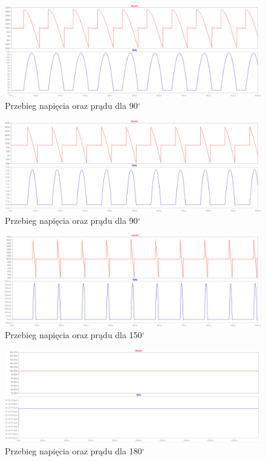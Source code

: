 \documentclass[11pt]{article}
\begin{document}
\begin{figure}[H]
    \centering
    \includegraphics[width=1\linewidth]{aun1_fbps-90.png}
    \caption{Przebieg napięcia oraz prądu dla 90$^{\circ}$}
    \label{fig:aun1_fbps-90}
\end{figure}
\begin{figure}[H]
    \centering
    \includegraphics[width=1\linewidth]{aun1_fbps-120.png}
    \caption{Przebieg napięcia oraz prądu dla 90$^{\circ}$}
    \label{fig:aun1_fbps-120}
\end{figure}
\begin{figure}[H]
    \centering
    \includegraphics[width=1\linewidth]{aun1_fbps-150.png}
    \caption{Przebieg napięcia oraz prądu dla 150$^{\circ}$}
    \label{fig:aun1_fbps-150}
\end{figure}
\begin{figure}[H]
    \centering
    \includegraphics[width=1\linewidth]{aun1_fbps-180.png}
    \caption{Przebieg napięcia oraz prądu dla 180$^{\circ}$}
    \label{fig:aun1_fbps-180}
\end{figure}
\end{document}
